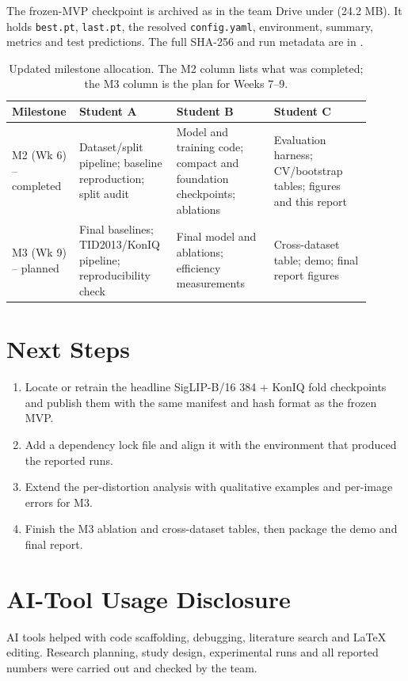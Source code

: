 \documentclass[11pt]{article}
\begin{document}
The frozen-MVP checkpoint is archived as  in the
team Drive under  (24.2 MB). It holds \texttt{best.pt},
\texttt{last.pt}, the resolved \texttt{config.yaml}, environment, summary, metrics and test
predictions. The full SHA-256 and run metadata are in
.

\begin{table}[H]
\centering
\small
\caption{Updated milestone allocation. The M2 column lists what was completed; the M3
column is the plan for Weeks 7--9.}
\label{tab:tasks}
\begin{tabular}{@{}>{\raggedright\arraybackslash}p{0.12\linewidth}>{\raggedright\arraybackslash}p{0.26\linewidth}>{\raggedright\arraybackslash}p{0.26\linewidth}>{\raggedright\arraybackslash}p{0.26\linewidth}@{}}
\toprule
\textbf{Milestone} & \textbf{Student A} & \textbf{Student B} & \textbf{Student C} \\
\midrule
M2 (Wk 6) -- completed &
Dataset/split pipeline; baseline reproduction; split audit &
Model and training code; compact and foundation checkpoints; ablations &
Evaluation harness; CV/bootstrap tables; figures and this report \\
M3 (Wk 9) -- planned &
Final baselines; TID2013/KonIQ pipeline; reproducibility check &
Final model and ablations; efficiency measurements &
Cross-dataset table; demo; final report figures \\
\bottomrule
\end{tabular}
\end{table}

\section{Next Steps}
\label{sec:next}

\begin{enumerate}[leftmargin=*]
  \item Locate or retrain the headline SigLIP-B/16 384 + KonIQ fold checkpoints and publish
        them with the same manifest and hash format as the frozen MVP.
  \item Add a dependency lock file and align it with the environment that produced the
        reported runs.
  \item Extend the per-distortion analysis with qualitative examples and per-image errors
        for M3.
  \item Finish the M3 ablation and cross-dataset tables, then package the demo and final
        report.
\end{enumerate}

\section*{AI-Tool Usage Disclosure}
AI tools helped with code scaffolding, debugging, literature search and LaTeX editing.
Research planning, study design, experimental runs and all reported numbers were carried
out and checked by the team.



\end{document}
